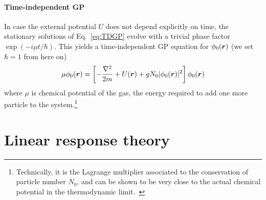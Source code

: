 \paragraph{Time-independent GP}
In case the external potential $U$ does not depend explicitly on time,
the stationary solutions of Eq.~\eqref{eq:TDGP} evolve with a trivial
phase factor $\exp(-i\mu t/\hbar)$. This yields a time-independent GP
equation for $\phi_0(\bm{r})$ (we set $\hbar = 1$ from here on)
%
\begin{equation}\label{eq:TIGP}
  \mu\phi_0(\bm{r}) = \left[-\frac{\nabla^2}{2m} + U(\bm{r})+
    g N_0 |\phi_0(\bm{r})|^2\right]\phi_0(\bm{r})
\end{equation}
where $\mu$ is chemical potential of the gas, the energy required to
add one more particle to the system.\footnote{Technically, it is the
  Lagrange multiplier associated to the conservation of particle
  number $N_0$, and can be shown to be very close to the actual
  chemical potential in the thermodynamic limit.~\cite{9783540410478}}


\section{Linear response theory}
\label{sec:linear-response}

